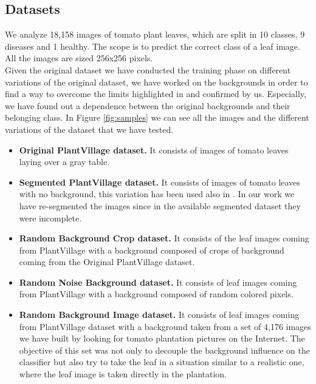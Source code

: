 \subsection{Datasets}
We analyze 18,158 images of tomato plant leaves, which are split in 10 classes, 9 diseases and 1 healthy. The scope is to predict the correct class of a leaf image. All the images are sized 256x256 pixels. 
\\\indent Given the original dataset we have conducted the training phase on different variations of the original dataset, we have worked on the backgrounds in order to find a way to overcome the limits highlighted in \cite{ref33, ref10} and confirmed by us. Especially, we have found out a dependence between the original backgrounds and their belonging class.
In Figure \ref{fig:samples} we can see all the images and the different variations of the dataset that we have tested.
\begin{itemize}
	\item{\textbf{Original PlantVillage dataset.} It consists of images of tomato leaves laying over a gray table.}
	\vspace{-5pt}
	\item{\textbf{Segmented PlantVillage dataset.} It consists of images of tomato leaves with no background, this variation has been used also in \cite{ref10}. In our work we have re-segmented the images since in the available segmented dataset they were incomplete.}
	\vspace{-5pt}
	\item{\textbf{Random Background Crop dataset.} It consists of the leaf images coming from PlantVillage with a background composed of crops of background coming from the Original PlantVillage dataset.}
	\vspace{-5pt}
	\item{\textbf{Random Noise Background dataset.} It consists of leaf images coming from PlantVillage with a background composed of random colored pixels.}
	\vspace{-5pt}
	\item{\textbf{Random Background Image dataset.} It consists of leaf images coming from PlantVillage dataset with a background taken from a set of 4,176 images we have built by looking for tomato plantation pictures on the Internet. The objective of this set was not only to decouple the background influence on the classifier but also try to take the leaf in a situation similar to a realistic one, where the leaf image is taken directly in the plantation.}
\end{itemize}
